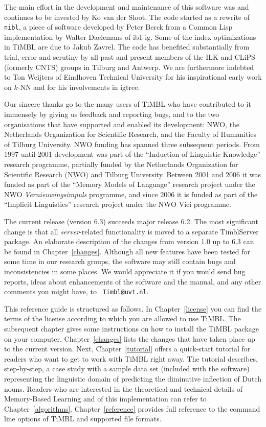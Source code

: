 \documentclass{report}
\begin{document}
The main effort in the development and maintenance of this software
was and continues to be invested by Ko van der Sloot. The code started
as a rewrite of {\tt nibl}, a piece of software developed by Peter
Berck from a Common Lisp implementation by Walter Daelemans of {\sc
  ib1-ig}. Some of the index optimizations in TiMBL are due to Jakub
Zavrel. The code has benefited substantially from trial, error and
scrutiny by all past and present members of the ILK and CLiPS
(formerly CNTS) groups in Tilburg and Antwerp. We are furthermore
indebted to Ton Weijters of Eindhoven Technical University for his
inspirational early work on $k$-NN and for his involvements in {\sc
  igtree}.

Our sincere thanks go to the many users of TiMBL who have contributed
to it immensely by giving us feedback and reporting bugs, and to the
two organisations that have supported and enabled its development:
NWO, the Netherlands Organization for Scientific Research, and the
Faculty of Humanities of Tilburg University. NWO funding has spanned
three subsequent periods. From 1997 until 2001 development was part of
the ``Induction of Linguistic Knowledge'' research programme,
partially funded by the Netherlands Organization for Scientific
Research (NWO) and Tilburg University. Between 2001 and 2006 it was
funded as part of the ``Memory Models of Language'' research project
under the NWO {\em Vernieuwingsimpuls}\/ programme, and since 2006 it
is funded as part of the ``Implicit Linguistics'' research project
under the NWO Vici programme.

The current release (version 6.3) succeeds major release 6.2. The most
significant change is that all {\em server}-related functionality is
moved to a separate TimblServer package.  An elaborate description of
the changes from version 1.0 up to 6.3 can be found in
Chapter~\ref{changes}.  Although all new features have been tested for
some time in our research groups, the software may still contain bugs
and inconsistencies in some places. We would appreciate it if you
would send bug reports, ideas about enhancements of the software and
the manual, and any other comments you might have, to {\tt
  Timbl@uvt.nl}.

This reference guide is structured as follows. In
Chapter~\ref{license} you can find the terms of the license according
to which you are allowed to use TiMBL. The subsequent chapter gives
some instructions on how to install the TiMBL package on your
computer. Chapter~\ref{changes} lists the changes that have taken
place up to the current version. Next, Chapter~\ref{tutorial} offers a
quick-start tutorial for readers who want to get to work with TiMBL
right away. The tutorial describes, step-by-step, a case study with a
sample data set (included with the software) representing the
linguistic domain of predicting the diminutive inflection of Dutch
nouns.  Readers who are interested in the theoretical and technical
details of Memory-Based Learning and of this implementation can refer
to Chapter~\ref{algorithms}. Chapter~\ref{reference} provides full
reference to the command line options of TiMBL and supported file
formats.
\end{document}
